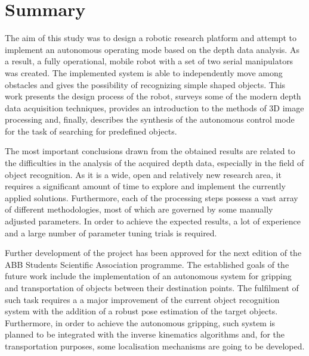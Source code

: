 \chapter*{Summary}
\label{cha:summary}

The aim of this study was to design a robotic research platform and attempt to implement an autonomous operating mode based on the depth data analysis. As a result, a fully operational, mobile robot with a set of two serial manipulators was created. The implemented system is able to independently move among obstacles and gives the possibility of recognizing simple shaped objects. This work presents the design process of the robot, surveys some of the modern depth data acquisition techniques, provides an introduction to the methods of 3D image processing and, finally, describes the synthesis of the autonomous control mode for the task of searching for predefined objects. 

The most important conclusions drawn from the obtained results are related to the difficulties in the analysis of the acquired depth data, especially in the field of object recognition. As it is a wide, open and relatively new research area, it requires a significant amount of time to explore and implement the currently applied solutions. Furthermore, each of the processing steps possess a vast array of different methodologies, most of which are governed by some manually adjusted parameters. In order to achieve the expected results, a lot of experience and a large number of parameter tuning trials is required.

Further development of the project has been approved for the next edition of the ABB Students Scientific Association programme. The established goals of the future work include the implementation of an autonomous system for gripping and transportation of objects between their destination points. The fulfilment of such task requires a a major improvement of the current object recognition system with the addition of a robust pose estimation of the target objects. Furthermore, in order to achieve the autonomous gripping, such system is planned to be integrated with the inverse kinematics algorithms and,  for the transportation purposes, some localisation mechanisms are going to be developed.